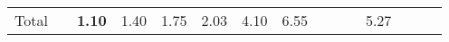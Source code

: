 \begin{tabular}{ll|rrrrrr|rrrrrrr}
  \hline
  Total  & &



  


  
  \textbf{1.10} & 1.40 & 1.75 & 2.03 & 4.10 & 6.55 &  &  &  & 5.27 &  \\


\end{tabular}
